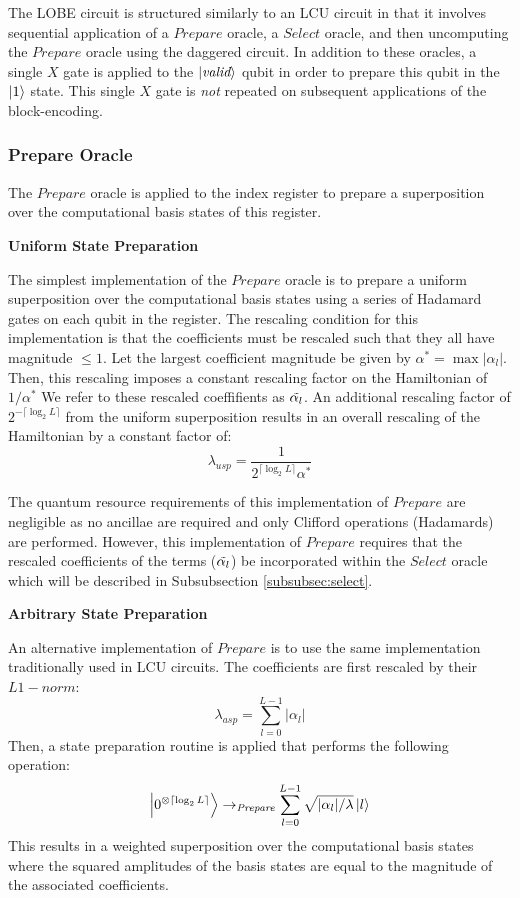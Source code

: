 The LOBE circuit is structured similarly to an LCU circuit in that it involves sequential application of a $\textit{Prepare}$ oracle, a $\textit{Select}$ oracle, and then uncomputing the $\textit{Prepare}$ oracle using the daggered circuit.
In addition to these oracles, a single $X$ gate is applied to the $\ket{\textit{valid}}$ qubit in order to prepare this qubit in the $\ket{1}$ state.
This single $X$ gate is \textit{not} repeated on subsequent applications of the block-encoding.

\subsubsection{Prepare Oracle}
The $\textit{Prepare}$ oracle is applied to the index register to prepare a superposition over the computational basis states of this register.

\textbf{Uniform State Preparation}

The simplest implementation of the $\textit{Prepare}$ oracle is to prepare a uniform superposition over the computational basis states using a series of Hadamard gates on each qubit in the register.
The rescaling condition for this implementation is that the coefficients must be rescaled such that they all have magnitude $\leq 1$.
Let the largest coefficient magnitude be given by $\alpha^* = \max{|\alpha_l|}$.
Then, this rescaling imposes a constant rescaling factor on the Hamiltonian of $1 / \alpha^*$
We refer to these rescaled coeffifients as $\Tilde{\alpha_l}$.
An additional rescaling factor of $2^{-\lceil \log_2{L} \rceil}$ from the uniform superposition results in an overall rescaling of the Hamiltonian by a constant factor of:
\begin{equation}
    \lambda_{usp} = \frac{1}{2^{\lceil \log_2{L} \rceil} \alpha^*}
\end{equation}

The quantum resource requirements of this implementation of $\textit{Prepare}$ are negligible as no ancillae are required and only Clifford operations (Hadamards) are performed.
However, this implementation of $\textit{Prepare}$ requires that the rescaled coefficients of the terms ($\Tilde{\alpha_l}$) be incorporated within the $\textit{Select}$ oracle which will be described in Subsubsection \ref{subsubsec:select}.

\textbf{Arbitrary State Preparation}

An alternative implementation of $\textit{Prepare}$ is to use the same implementation traditionally used in LCU circuits.
The coefficients are first rescaled by their $L1-norm$:
\begin{equation}
    \lambda_{asp} = \sum_{l=0}^{L-1} |\alpha_l|
\end{equation}
Then, a state preparation routine is applied that performs the following operation:
\begin{equation}
    \ket{0^{\otimes \lceil \log_2{L} \rceil}} \rightarrow_{\textit{Prepare}} \sum_{l = 0}^{L-1} \sqrt{|\alpha_l| / \lambda} \ket{l}
\end{equation}
This results in a weighted superposition over the computational basis states where the squared amplitudes of the basis states are equal to the magnitude of the associated coefficients.

